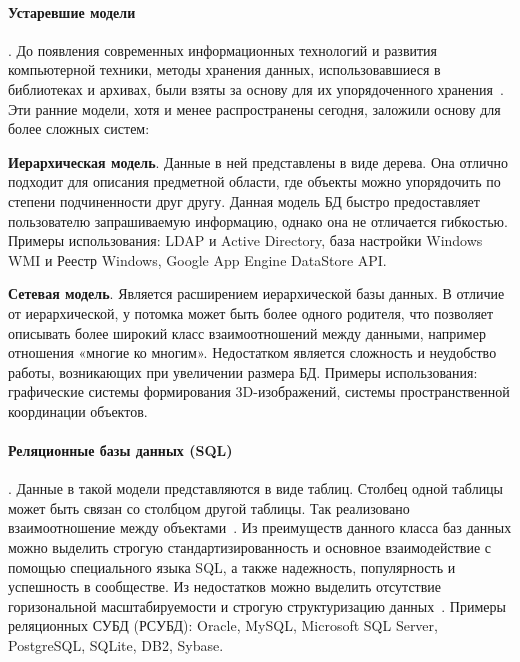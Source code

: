 \paragraph{Устаревшие модели}. До появления современных информационных технологий и
развития компьютерной техники, методы хранения данных, использовавшиеся в библиотеках и архивах,
были взяты за основу для их упорядоченного хранения~\cite{koryaginModeliBazDannyh2020}.
Эти ранние модели, хотя и менее распространены сегодня, заложили основу для более сложных систем:
\begin{compactitem}
      \item \textbf{Иерархическая модель}. Данные в ней представлены в виде дерева.
      Она отлично подходит для описания предметной области,
      где объекты можно упорядочить по степени подчиненности друг другу.
      Данная модель БД быстро предоставляет пользователю запрашиваемую информацию,
      однако она не отличается гибкостью. Примеры использования: LDAP и Active Directory,
      база настройки Windows WMI и Реестр Windows, Google App Engine DataStore API.
      \item\textbf{Сетевая модель}. Является расширением иерархической базы данных.
      В отличие от иерархической, у потомка может быть более одного родителя,
      что позволяет описывать более широкий класс взаимоотношений между данными, например отношения «многие ко многим».
      Недостатком является сложность и неудобство работы, возникающих при увеличении размера БД. Примеры использования:
      графические системы формирования 3D-изображений, системы пространственной координации объектов.
\end{compactitem}

\paragraph{Реляционные базы данных (SQL)}. Данные в такой модели представляются в виде
таблиц. Столбец одной таблицы может быть связан со столбцом другой таблицы.
Так реализовано взаимоотношение между объектами~\cite{koryaginModeliBazDannyh2020,smallcombeSQLVsNoSQL,
      savoskinIssledovanieSposobovPrimeneniya2019, kleymenovNoSQLRelyacionnyeBazy2022}.
Из преимуществ данного класса баз данных можно выделить
строгую стандартизированность и основное взаимодействие с помощью специального языка SQL,
а также надежность, популярность и успешность в сообществе.
Из недостатков можно выделить отсутствие горизональной масштабируемости
и строгую структуризацию данных~\cite{koryaginModeliBazDannyh2020}.
Примеры реляционных СУБД (РСУБД): Oracle, MySQL, Microsoft SQL Server, PostgreSQL, SQLite, DB2, Sybase.

